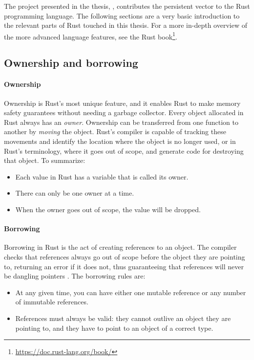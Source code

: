 The project presented in the thesis, \pvecrs{}, contributes the persistent vector to the Rust programming language. The following sections are a very basic introduction to the relevant parts of Rust touched in this thesis. For a more in-depth overview of the more advanced language features, see the Rust book\footnote{\url{https://doc.rust-lang.org/book/}}.

\subsection{Ownership and borrowing}

\paragraph{Ownership}
Ownership is Rust's most unique feature, and it enables Rust to make memory safety guarantees without needing a garbage collector. Every object allocated in Rust always has an \emph{owner}. Ownership can be transferred from one function to another by \emph{moving} the object. Rust's compiler is capable of tracking these movements and identify the location where the object is no longer used, or in Rust's terminology, where it goes out of scope, and generate code for destroying that object. To summarize:

\begin{itemize}
    \item Each value in Rust has a variable that is called its owner.
    \item There can only be one owner at a time.
    \item When the owner goes out of scope, the value will be dropped.
\end{itemize}

\paragraph{Borrowing}
Borrowing in Rust is the act of creating references to an object. The compiler checks that references always go out of scope before the object they are pointing to, returning an error if it does not, thus guaranteeing that references will never be dangling pointers \cite{reed-patina}. The borrowing rules are:

\begin{itemize}
    \item At any given time, you can have either one mutable reference or any number of immutable references.
    \item References must always be valid: they cannot outlive an object they are pointing to, and they have to point to an object of a correct type.
\end{itemize}

